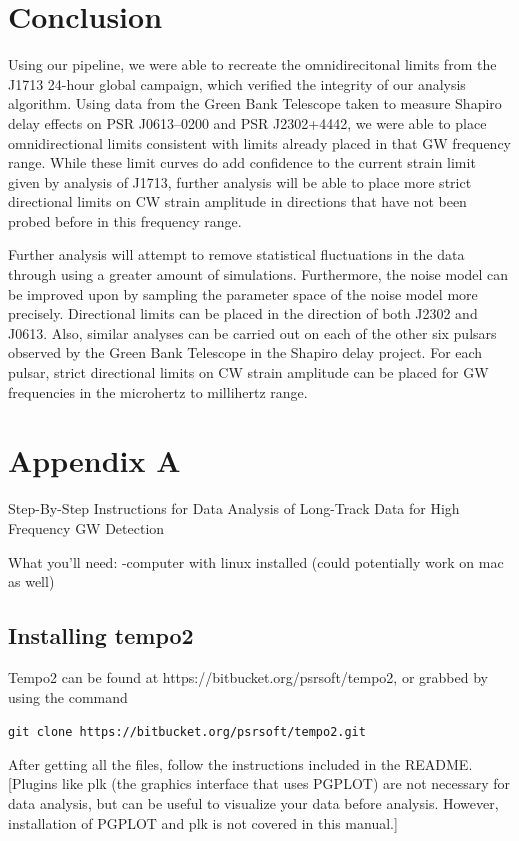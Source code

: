 \documentclass[12pt]{article}
\newcommand{\code}[1]{\colorbox{light-gray}{\texttt{#1}}}
\begin{document}
\section{Conclusion}
    Using our pipeline, we were able to recreate the omnidirecitonal limits from the J1713 24-hour global campaign, which verified the
integrity of our analysis algorithm. Using data from the Green Bank Telescope
taken to measure Shapiro delay effects on PSR J0613--0200 and PSR J2302+4442, we
were able to place omnidirectional limits consistent with limits already placed
in that GW frequency range. 
    While these limit curves do add confidence to the current strain limit given
by analysis of J1713, further analysis will be able to place more strict
directional limits on CW strain amplitude in directions that have not been
probed before in this frequency range.

    Further analysis will attempt to remove statistical fluctuations in the data
through using a greater amount of simulations. Furthermore, the noise model can
be improved upon by sampling the parameter space of the noise model more
precisely. Directional limits can be placed in the direction of both J2302 and
J0613. Also, similar analyses can be carried out on each of the other six
pulsars observed by the Green Bank Telescope in the Shapiro delay project. For
each pulsar, strict directional limits on CW strain amplitude can be placed for
GW frequencies in the microhertz to millihertz range.


\section{Appendix A}

Step-By-Step Instructions for Data Analysis of Long-Track Data for High
Frequency GW Detection

What you'll need: -computer with linux installed (could potentially work on mac
as well)

\subsection{Installing tempo2}

Tempo2 can be found at
https://bitbucket.org/psrsoft/tempo2, or grabbed by using the command

\code{git clone https://bitbucket.org/psrsoft/tempo2.git}

After getting all the files, follow the instructions included in the README.
[Plugins like plk (the graphics interface that uses PGPLOT) are not necessary for
data analysis, but can be useful to visualize your data before analysis.
However, installation of PGPLOT and plk is not covered in this manual.]
\end{document}
